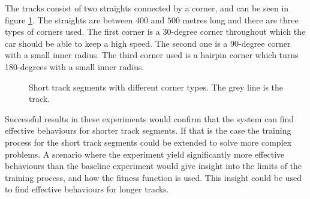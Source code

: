 The tracks consist of two straights connected by a corner, and can be seen in figure \ref{fig:short_tracks}. The straights are between $400$ and $500$ metres long and there are three types of corners used. The first corner is a 30-degree corner throughout which the car should be able to keep a high speed. The second one is a 90-degree corner with a small inner radius. The third corner used is a hairpin corner which turns 180-degrees with a small inner radius. 

\begin{figure}[H]
    \centering
    \qquad
    \qquad

    \caption{Short track segments with different corner types. The grey line is the track.}
    \label{fig:short_tracks}
\end{figure}

\noindent
Successful results in these experiments would confirm that the system can find effective behaviours for shorter track segments. If that is the case the training process for the short track segments could be extended to solve more complex problems. A scenario where the experiment yield significantly more effective behaviours than the baseline experiment would give insight into the limits of the training process, and how the fitness function is used. This insight could be used to find effective behaviours for longer tracks. 



